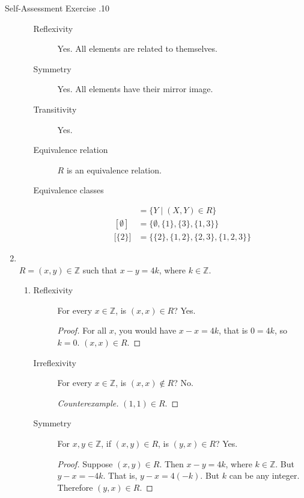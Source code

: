 \documentclass[../notes.tex]{subfiles}
\begin{document}
\begin{exercise}{Self-Assessment Exercise \thechapter.10}
\begin{enumerate}
\begin{enumerate}[label=(\alph*)]
\begin{description}
										\item[Reflexivity] Yes. All elements are related to themselves.
										\item[Symmetry] Yes. All elements have their mirror image.
										\item[Transitivity] Yes.
										\item[Equivalence relation] $R$ is an equivalence relation.
										\item[Equivalence classes] \moveup
											\begin{align*}
												[X] &= \{Y \mid (X, Y) \in R\}\\
												[\emptyset] &= \bigl\{\emptyset, \{1\}, \{3\}, \{1, 3\}\bigr\}\\
												\bigl[\{2\}\bigr] &= \bigl\{\{2\}, \{1, 2\}, \{2, 3\}, \{1, 2, 3\}\bigr\}
											\end{align*}    
									\end{description}
							\end{enumerate}
						\item {}\\
							$R = (x, y) \in \mathbb{Z}$ such that $ x - y = 4k$, where $k \in \mathbb{Z}$.
							\begin{enumerate}[label=(\alph*)]
								\item {}
									\begin{description}
										\item[Reflexivity] For every $x \in \mathbb{Z}$, is $(x, x) \in R$? Yes.
											\begin{proof}
												For all $x$, you would have $x - x = 4k$, that is $0 = 4k$, so $k = 0$. $(x, x) \in R$.
											\end{proof}
										\item[Irreflexivity] For every $x \in \mathbb{Z}$, is $(x, x) \notin R$? No.
											\begin{proof}[Counterexample]
												$(1, 1) \in R$.
											\end{proof}
										\item[Symmetry] For $x, y \in \mathbb{Z}$, if $(x, y) \in R$, is $(y, x) \in R$? Yes.
											\begin{proof}
												Suppose $(x, y) \in R$. Then $x - y = 4k$, where $k \in \mathbb{Z}$. But $y - x = -4k$. That is, $y - x = 4(-k)$. But $k$ can be any integer. Therefore $(y, x) \in R$.

\end{proof}
\end{description}
\end{enumerate}
\end{enumerate}
\end{exercise}
\end{document}
